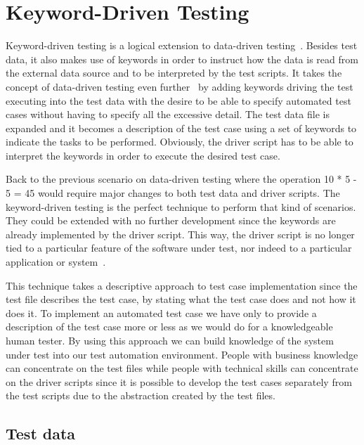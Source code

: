 \section{Keyword-Driven Testing}

Keyword-driven testing is a logical extension to data-driven testing~\cite{Fewster99}.
Besides test data, it also makes use of keywords in order to instruct how the
data is read from the external data source and to be interpreted by the test
scripts. It takes the concept of data-driven testing even further~\cite{Lau07}
by adding keywords driving the test executing into the test data with the desire
to be able to specify automated test cases without having to specify all the
excessive detail. The test data file is expanded and it becomes a description of
the test case using a set of keywords to indicate the tasks to be performed.
Obviously, the driver script has to be able to interpret the keywords in order
to execute the desired test case.

Back to the previous scenario on data-driven testing where the operation
10 * 5 - 5 = 45 would require major changes to both test data and driver
scripts. The keyword-driven testing is the perfect technique to perform that
kind of scenarios. They could be extended with no further development since the
keywords are already implemented by the driver script. This way, the driver
script is no longer tied to a particular feature of the software under test,
nor indeed to a particular application or system~\cite{Fewster99}.

This technique takes a descriptive approach to test case implementation since
the test file describes the test case, by stating what the test case does and
not how it does it. To implement an automated test case we have only to provide
a description of the test case more or less as we would do for a knowledgeable
human tester. By using this approach we can build knowledge of the system under
test into our test automation environment. People with business knowledge can
concentrate on the test files while people with technical skills can concentrate
on the driver scripts since it is possible to develop the test cases separately
from the test scripts due to the abstraction created by the test files.

\subsection{Test data}

